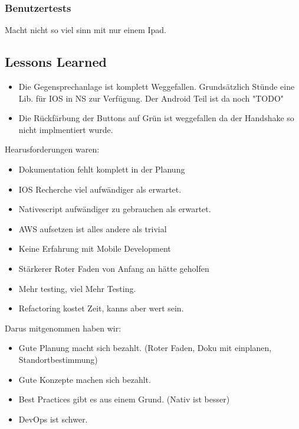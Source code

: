 \subsubsection*{Benutzertests}
Macht nicht so viel sinn mit nur einem Ipad.

\clearpage
\subsection{Lessons Learned}

\clearpage
\begin{itemize}
    \item Die Gegensprechanlage ist komplett Weggefallen.
    \subitem Grundsätzlich Stünde eine Lib. für IOS in NS zur Verfügung. Der Android Teil ist da noch "TODO"
    \item Die Rückfärbung der Buttons auf Grün ist weggefallen da der Handshake so nicht implmentiert wurde.
\end{itemize}


Hearusforderungen waren:
\begin{itemize}
    \item Dokumentation fehlt komplett in der Planung
    \item IOS Recherche viel aufwändiger als erwartet.
    \item Nativescript aufwändiger zu gebrauchen als erwartet.
    \item AWS aufsetzen ist alles andere als trivial
    \item Keine Erfahrung mit Mobile Development
    \item Stärkerer Roter Faden von Anfang an hätte geholfen
    \item Mehr testing, viel Mehr Testing.
    \item Refactoring kostet Zeit, kanns aber wert sein.
\end{itemize}

Darus mitgenommen haben wir:
\begin{itemize}
    \item Gute Planung macht sich bezahlt. (Roter Faden, Doku mit einplanen, Standortbestimmung)
    \item Gute Konzepte machen sich bezahlt.
    \item Best Practices gibt es aus einem Grund. (Nativ ist besser)
    \item DevOps ist schwer.
\end{itemize}





